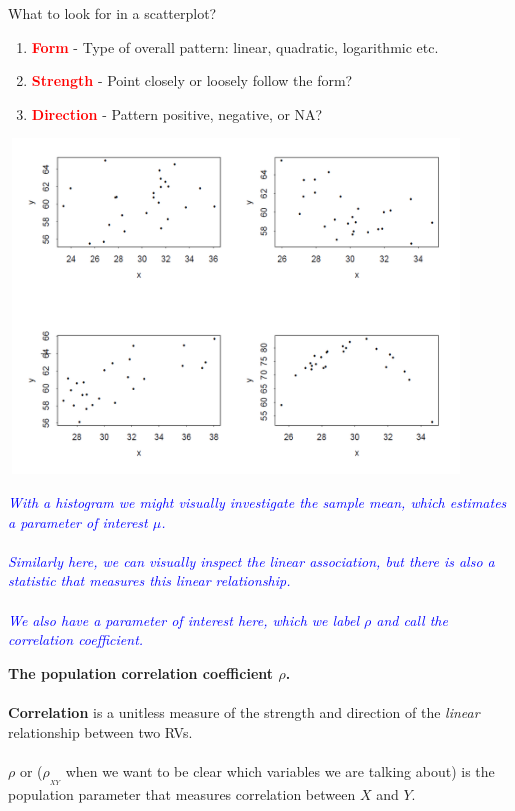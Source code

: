 \newpage

What to look for in a scatterplot? \\
\begin{enumerate}
	\item \textcolor{red}{\textbf{Form}}
	- Type of overall pattern: linear, quadratic, logarithmic etc.\\
	\item \textcolor{red}{\textbf{Strength}}
	- Point closely or loosely follow the form?\\
	\item \textcolor{red}{\textbf{Direction}} 
	- Pattern positive, negative, or NA?
\end{enumerate}

\begin{center}
\includegraphics[height=3.5in,width=4.75in]{scattermatch}
\end{center}

\textit{\textcolor{blue}{With a histogram we might visually investigate the sample mean, which estimates a parameter of interest $\mu$.\\~\\
Similarly here, we can visually inspect the linear association, but there is also a statistic that measures this linear relationship.  \\~\\
We also have a parameter of interest here, which we label $\rho$ and call the correlation coefficient.}}

\newpage

\Large \textbf{The population correlation coefficient $\rho$.} \large\\~\\
\textbf{Correlation} is a unitless measure of the strength and direction of the \textit{linear} relationship between two RVs.\\~\\
$\rho$ or ($\rho_{_{XY}}$ when we want to be clear which variables we are talking about) is the population parameter that measures correlation between $X$ and $Y$.\\

